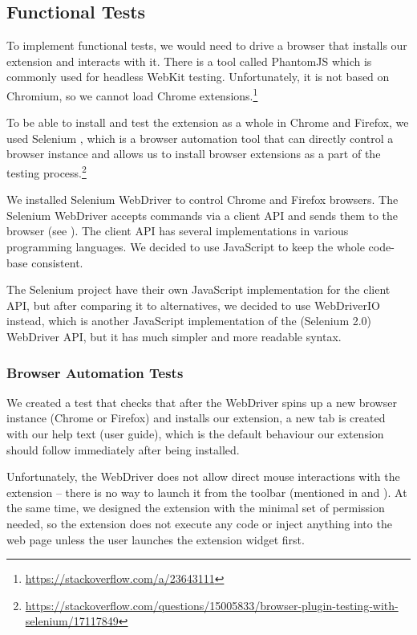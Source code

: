 \documentclass[bsc,frontabs,twoside,singlespacing,parskip,deptreport]{infthesis}
\begin{document}
\subsection{Functional Tests}
To implement functional tests, we would need to drive a browser that installs our extension and interacts with it. There is a tool called PhantomJS \cite{A14} which is commonly used for headless WebKit testing. Unfortunately, it is not based on Chromium, so we cannot load Chrome extensions.\footnote{\url{https://stackoverflow.com/a/23643111}}

To be able to install and test the extension as a whole in Chrome and Firefox, we used Selenium \cite{A15}, which is a browser automation tool that can directly control a browser instance and allows us to install browser extensions as a part of the testing process.\footnote{\url{https://stackoverflow.com/questions/15005833/browser-plugin-testing-with-selenium/17117849}}

We installed Selenium WebDriver to control Chrome and Firefox browsers. The Selenium WebDriver accepts commands via a client API and sends them to the browser (see \cite{W2}). The client API has several implementations in various programming languages. We decided to use JavaScript to keep the whole code-base consistent. 

The Selenium project have their own JavaScript implementation for the client API, but after comparing it to alternatives, we decided to use WebDriverIO \cite{A16} instead, which is another JavaScript implementation of the (Selenium 2.0) WebDriver API, but it has much simpler and more readable syntax.

\subsubsection{Browser Automation Tests}
We created a test that checks that after the WebDriver spins up a new browser instance (Chrome or Firefox) and installs our extension, a new tab is created with our help text (user guide), which is the default behaviour our extension should follow immediately after being installed.

Unfortunately, the WebDriver does not allow direct mouse interactions with the extension -- there is no way to launch it from the toolbar (mentioned in \cite{A17} and \cite{A18}). At the same time, we designed the extension with the minimal set of permission needed, so the extension does not execute any code or inject anything into the web page unless the user launches the extension widget first.
\end{document}
